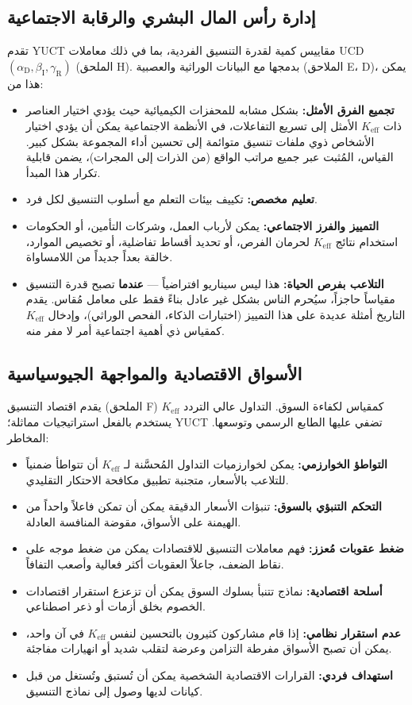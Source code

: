\documentclass[12pt,a4paper]{article}
\theoremstyle{remark}
\newcommand{\Keff}{K_{\mathrm{eff}}}
\newcommand{\alD}{\alpha_{\mathrm{D}}}
\newcommand{\beI}{\beta_{\mathrm{I}}}
\newcommand{\gaR}{\gamma_{\mathrm{R}}}
\begin{document}
	\subsection{إدارة رأس المال البشري والرقابة الاجتماعية}
	\label{subsec:human}
	
	تقدم YUCT مقاييس كمية لقدرة التنسيق الفردية، بما في ذلك معاملات UCD \((\alD,\beI,\gaR)\) (الملحق H). بدمجها مع البيانات الوراثية والعصبية (الملاحق E، D)، يمكن هذا من:
	\begin{itemize}[leftmargin=*]
		\item \textbf{تجميع الفرق الأمثل:} بشكل مشابه للمحفزات الكيميائية حيث يؤدي اختيار العناصر ذات \(\Keff\) الأمثل إلى تسريع التفاعلات، في الأنظمة الاجتماعية يمكن أن يؤدي اختيار الأشخاص ذوي ملفات تنسيق متوائمة إلى تحسين أداء المجموعة بشكل كبير. القياس، المُثبت عبر جميع مراتب الواقع (من الذرات إلى المجرات)، يضمن قابلية تكرار هذا المبدأ.
		\item \textbf{تعليم مخصص:} تكييف بيئات التعلم مع أسلوب التنسيق لكل فرد.
		\item \textbf{التمييز والفرز الاجتماعي:} يمكن لأرباب العمل، وشركات التأمين، أو الحكومات استخدام نتائج \(\Keff\) لحرمان الفرص، أو تحديد أقساط تفاضلية، أو تخصيص الموارد، خالقة بعداً جديداً من اللامساواة.
		\item \textbf{التلاعب بفرص الحياة:} هذا ليس سيناريو افتراضياً — \textbf{عندما} تصبح قدرة التنسيق مقياساً حاجزاً، سيُحرم الناس بشكل غير عادل بناءً فقط على معامل مُقاس. يقدم التاريخ أمثلة عديدة على هذا التمييز (اختبارات الذكاء، الفحص الوراثي)، وإدخال \(\Keff\) كمقياس ذي أهمية اجتماعية أمر لا مفر منه.
	\end{itemize}
	
	\subsection{الأسواق الاقتصادية والمواجهة الجيوسياسية}
	\label{subsec:econ}
	
	يقدم اقتصاد التنسيق (الملحق F) \(\Keff\) كمقياس لكفاءة السوق. التداول عالي التردد يستخدم بالفعل استراتيجيات مماثلة؛ YUCT تضفي عليها الطابع الرسمي وتوسعها. المخاطر:
	\begin{itemize}[leftmargin=*]
		\item \textbf{التواطؤ الخوارزمي:} يمكن لخوارزميات التداول المُحسَّنة لـ \(\Keff\) أن تتواطأ ضمنياً للتلاعب بالأسعار، متجنبة تطبيق مكافحة الاحتكار التقليدي.
		\item \textbf{التحكم التنبؤي بالسوق:} تنبؤات الأسعار الدقيقة يمكن أن تمكن فاعلاً واحداً من الهيمنة على الأسواق، مقوضة المنافسة العادلة.
		\item \textbf{ضغط عقوبات مُعزز:} فهم معاملات التنسيق للاقتصادات يمكن من ضغط موجه على نقاط الضعف، جاعلاً العقوبات أكثر فعالية وأصعب التفافاً.
		\item \textbf{أسلحة اقتصادية:} نماذج تتنبأ بسلوك السوق يمكن أن تزعزع استقرار اقتصادات الخصوم بخلق أزمات أو ذعر اصطناعي.
		\item \textbf{عدم استقرار نظامي:} إذا قام مشاركون كثيرون بالتحسين لنفس \(\Keff\) في آن واحد، يمكن أن تصبح الأسواق مفرطة التزامن وعرضة لتقلب شديد أو انهيارات مفاجئة.
		\item \textbf{استهداف فردي:} القرارات الاقتصادية الشخصية يمكن أن تُستبق وتُستغل من قبل كيانات لديها وصول إلى نماذج التنسيق.
	\end{itemize}
	
\end{document}
